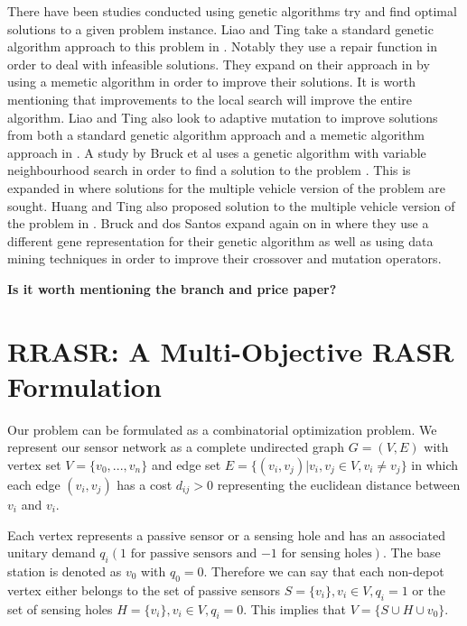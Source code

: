 \documentclass[conference]{IEEEtran}
\begin{document}
There have been studies conducted using genetic algorithms try and find optimal solutions to a given problem instance. Liao and Ting take a standard genetic algorithm approach to this problem in \cite{liao2010evolutionary}. Notably they use a repair function in order to deal with infeasible solutions. They expand on their approach in \cite{ting2013selective} by using a memetic algorithm in order to improve their solutions. It is worth mentioning that improvements to the local search will improve the entire algorithm. Liao and Ting also look to adaptive mutation to improve solutions from both a standard genetic algorithm approach and a memetic algorithm approach in \cite{liao2012evolutionary}. A study by Bruck et al uses a genetic algorithm with variable neighbourhood search in order to find a solution to the problem \cite{bruck2012hybrid}. This is expanded in \cite{6421345} where solutions for the multiple vehicle version of the problem are sought. Huang and Ting also proposed solution to the multiple vehicle version of the problem in \cite{5949836}. Bruck and dos Santos expand again on \cite{bruck2012hybrid} in \cite{bruck2012evolutionary} where they use a different gene representation for their genetic algorithm as well as using data mining techniques in order to improve their crossover and mutation operators.

\textbf{Is it worth mentioning the branch and price paper?} \\



\section{RRASR: A Multi-Objective RASR Formulation}
\label{sec:MOOProblem}

Our problem can be formulated as a combinatorial optimization problem. We represent our sensor network as a complete undirected graph $G=(V, E)$ with vertex set $V=\{v_0,...,v_n \}$ and edge set $E=\{(v_i,v_j) | v_i,v_j \in  V, v_i \neq v_j\}$ in which each edge $(v_i,v_j)$ has a cost $d_{ij}>0$ representing the euclidean distance between $v_i$ and $v_i$.

Each vertex represents a passive sensor or a sensing hole and has an associated unitary demand $q_i(1 \text{ for passive sensors and } {-1} \text{ for sensing holes})$. The base station is denoted as $v_0$ with $q_0=0$. Therefore we can say that each non-depot vertex either belongs to the set of passive sensors $S=\{v_i\},v_i \in V, q_i=1$ or the set of sensing holes $H=\{v_i\},v_i \in V, q_i=0$. This implies that $V = \{ S \cup H \cup v_0\}$.
\end{document}
